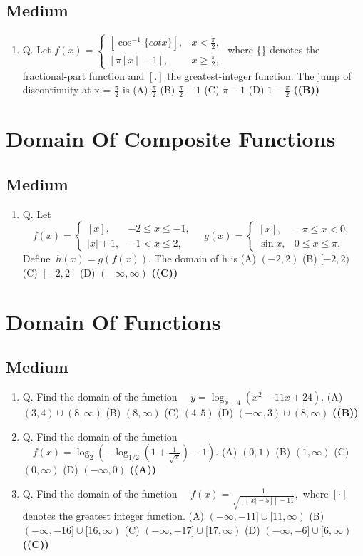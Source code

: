 \documentclass{article}
\begin{document}
\subsection{Medium}
\begin{enumerate}
\item Q. Let
$f(x) = \begin{cases} [\cos^{-1}\{cotx\}], & x < \frac{\pi}{2}, \\ [\pi[x] - 1], & x \ge \frac{\pi}{2}, \end{cases}$
where \{\} denotes the fractional-part function and $[.]$ the greatest-integer function. The jump of discontinuity at x = $\frac{\pi}{2}$ is
(A) $\frac{\pi}{2}$
(B) $\frac{\pi}{2} - 1$
(C) $\pi-1$
(D) $1-\frac{\pi}{2}$ \hfill \textbf{((B))}
\end{enumerate}
\section{Domain Of Composite Functions}
\subsection{Medium}
\begin{enumerate}
\item Q. Let
$\quad f(x) = \begin{cases} [x], & -2 \le x \le -1, \\ |x| + 1, & -1 < x \le 2, \end{cases} \quad g(x) = \begin{cases} [x], & -\pi \le x < 0, \\ \sin x, & 0 \le x \le \pi. \end{cases}$
Define $\ h(x) = g(f(x)).$ The domain of h is
(A) $( -2,2)$
(B) $[-2,2)$
(C) $[-2,2]$
(D) $(-\infty,\infty)$ \hfill \textbf{((C))}
\end{enumerate}
\section{Domain Of Functions}
\subsection{Medium}
\begin{enumerate}
\item Q. Find the domain of the function
$\quad y = \log_{x-4}(x^2 - 11x + 24).$
(A) $(3,4) \cup (8, \infty)$
(B) $(8,\infty)$
(C) $(4,5)$
(D) $(-\infty,3) \cup (8,\infty)$ \hfill \textbf{((B))}
\item Q. Find the domain of the function
$\quad f(x) = \log_2(-\log_{1/2}(1+\frac{1}{\sqrt{x}}) - 1).$
(A) $(0,1)$
(B) $(1,\infty)$
(C) $(0,\infty)$
(D) $(-\infty,0)$ \hfill \textbf{((A))}
\item Q. Find the domain of the function
$\quad f(x) = \frac{1}{\sqrt{[[|x|-5]] - 11}},$
where $[\cdot]$ denotes the greatest integer function.
(A) $(-\infty,-11] \cup [11, \infty)$
(B) $(-\infty, -16] \cup [16, \infty)$
(C) $(-\infty, -17] \cup [17, \infty)$
(D) $(-\infty, -6] \cup [6, \infty)$ \hfill \textbf{((C))}
\end{enumerate}
\end{document}
